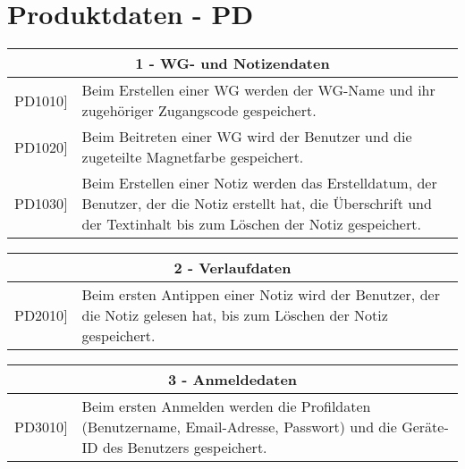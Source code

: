 \documentclass[a4paper]{scrreprt}
\begin{document}
    \chapter{Produktdaten - PD}
    	\begin{table}[h!]
    		\centering
    		\label{my-label}
    		\begin{tabular}{p{2cm}p{12cm}}
    			
    			\multicolumn{2}{c}{\textbf{1 - WG- und Notizendaten}} \\ \hline
    			\centering{[}PD1010{]} & Beim Erstellen einer WG werden der WG-Name und ihr zugehöriger Zugangscode gespeichert.\\
    			\centering{[}PD1020{]}& Beim Beitreten einer WG wird der Benutzer und die zugeteilte Magnetfarbe gespeichert.                                 \\
    			\centering{[}PD1030{]}& Beim Erstellen einer Notiz werden das Erstelldatum, der Benutzer, der die Notiz erstellt hat, die Überschrift und der Textinhalt bis zum Löschen der Notiz gespeichert.\\ 
    			\hline
    		\end{tabular}
    	\end{table}
    
        \vspace{5mm}
        
    	\begin{table}[h!]
    		\centering
    		\label{my-label}
    		\begin{tabular}{p{2cm}p{12cm}}
    			
    			\multicolumn{2}{c}{\textbf{2 - Verlaufdaten}} \\ \hline
    			\centering{[}PD2010{]} & Beim ersten Antippen einer Notiz wird der Benutzer, der die Notiz gelesen hat, bis zum Löschen der Notiz gespeichert.\\ 
    			\hline
    		\end{tabular}
    	\end{table}
    	
    	\vspace{5mm}
    	
    	\begin{table}[h!]
    		\centering
    		\label{my-label}
    		\begin{tabular}{p{2cm}p{12cm}}
    			
    			\multicolumn{2}{c}{\textbf{3 - Anmeldedaten}} \\ \hline
    			\centering{[}PD3010{]} & Beim ersten Anmelden werden die Profildaten (Benutzername, Email-Adresse, Passwort) und die Geräte-ID des Benutzers gespeichert.\\ 
    			\hline
    		\end{tabular}
    	\end{table}
    
\end{document}
